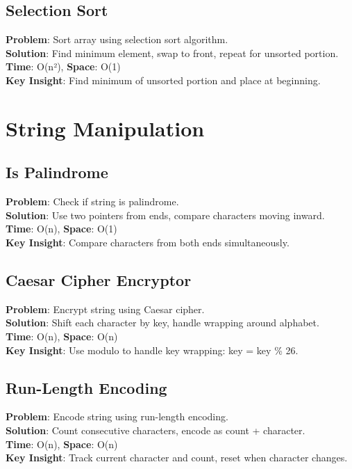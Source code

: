 \documentclass{report}
\begin{document}
\subsection{Selection Sort}
\textbf{Problem}: Sort array using selection sort algorithm.\\
\textbf{Solution}: Find minimum element, swap to front, repeat for unsorted portion.\\
\textbf{Time}: O(n²), \textbf{Space}: O(1)\\
\textbf{Key Insight}: Find minimum of unsorted portion and place at beginning.

\section{String Manipulation}

\subsection{Is Palindrome}
\textbf{Problem}: Check if string is palindrome.\\
\textbf{Solution}: Use two pointers from ends, compare characters moving inward.\\
\textbf{Time}: O(n), \textbf{Space}: O(1)\\
\textbf{Key Insight}: Compare characters from both ends simultaneously.

\subsection{Caesar Cipher Encryptor}
\textbf{Problem}: Encrypt string using Caesar cipher.\\
\textbf{Solution}: Shift each character by key, handle wrapping around alphabet.\\
\textbf{Time}: O(n), \textbf{Space}: O(n)\\
\textbf{Key Insight}: Use modulo to handle key wrapping: key = key \% 26.

\subsection{Run-Length Encoding}
\textbf{Problem}: Encode string using run-length encoding.\\
\textbf{Solution}: Count consecutive characters, encode as count + character.\\
\textbf{Time}: O(n), \textbf{Space}: O(n)\\
\textbf{Key Insight}: Track current character and count, reset when character changes.
\end{document}
